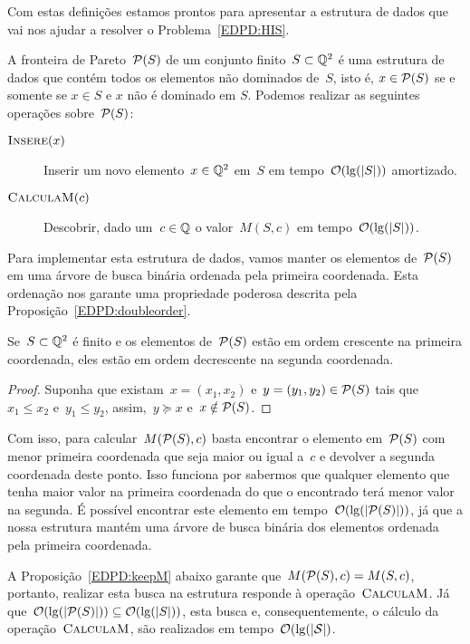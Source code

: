 Com estas definições estamos prontos para apresentar a estrutura de dados que vai nos ajudar a resolver o Problema~\ref{EDPD:HIS}.
\begin{defi} \label{EDPD:Pareto}
A fronteira de Pareto~$\mathcal{P}(S)$ de um conjunto finito~$S \subset \mathbb{Q}^2$ é uma estrutura de dados que contém todos os elementos não dominados de~$S$, isto é, $x \in \mathcal{P}(S)$ se e somente se $x \in S$ e $x$ não é dominado em $S$. Podemos realizar as seguintes operações sobre~$\mathcal{P}(S)$:

\begin{description}
\item[$\textsc{Insere}(x)$] Inserir um novo elemento~$x \in \mathbb{Q}^2$ em~$S$ em tempo~$\mathcal{O}(\lg(|S|))$ amortizado.
\item[$\textsc{CalculaM}(c)$] Descobrir, dado um~$c \in \mathbb{Q}$ o valor~$M(S,c)$ em tempo~$\mathcal{O}(\lg(|S|))$.
\end{description}
\end{defi}

Para implementar esta estrutura de dados, vamos manter os elementos de~$\mathcal{P}(S)$ em uma árvore de busca binária ordenada pela primeira coordenada. Esta ordenação nos garante uma propriedade poderosa descrita pela Proposição~\ref{EDPD:doubleorder}.

\begin{prop} \label{EDPD:doubleorder}
Se~$S \subset \mathbb{Q}^2$ é finito e os elementos de~$\mathcal{P}(S)$ estão em ordem crescente na primeira coordenada, eles estão em ordem decrescente na segunda coordenada.
\end{prop}
\begin{proof}
Suponha que existam~$x = (x_1,x_2)$ e~$y = (y_1,y_2) \in \mathcal{P}(S)$ tais que~$x_1 \leq x_2$ e~$y_1 \leq y_2$, assim,~$y \succeq x$ e~$x \notin \mathcal{P}(S)$.
\end{proof}

Com isso, para calcular~$M(\mathcal{P}(S),c)$ basta encontrar o elemento em~$\mathcal{P}(S)$ com menor primeira coordenada que seja maior ou igual a~$c$ e devolver a segunda coordenada deste ponto. Isso funciona por sabermos que qualquer elemento que tenha maior valor na primeira coordenada do que o encontrado terá menor valor na segunda. É possível encontrar este elemento em tempo~$\mathcal{O}(\lg(|\mathcal{P}(S)|))$, já que a nossa estrutura mantém uma árvore de busca binária dos elementos ordenada pela primeira coordenada. 

A Proposição~\ref{EDPD:keepM} abaixo garante que~${ M(\mathcal{P}(S),c) = M(S,c) }$, portanto, realizar esta busca na estrutura responde à operação~$\textsc{CalculaM}$. Já que~${\mathcal{O}(\lg(|\mathcal{P}(S)|)) \subseteq \mathcal{O}(\lg(|S|))}$, esta busca e, consequentemente, o cálculo da operação~$\textsc{CalculaM}$, são realizados em tempo~$\mathcal{ O(\lg(|S|) }$.

